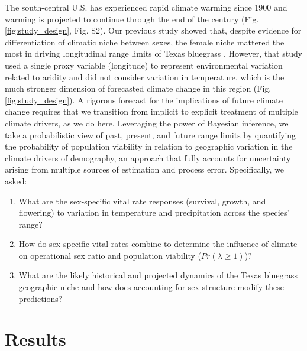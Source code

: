 \documentclass[9pt,twocolumn,twoside,lineno]{pnas-new}
\newcommand{\revise}[1]{{\color{Mahogany}{#1}}}
\begin{document}
The south-central U.S. has experienced rapid climate warming since 1900 and warming is projected to continue through the end of the century (Fig. \ref{fig:study_design}, Fig. S2). 
Our previous study showed that, despite evidence for differentiation of climatic niche between sexes, the female niche mattered the most in driving longitudinal range limits of Texas bluegrass \citep{miller2022two}. 
However, that study used a single proxy variable (longitude) to represent environmental variation related to aridity and did not consider variation in temperature, which is the much stronger dimension of forecasted climate change in this region (Fig. \ref{fig:study_design}). 
A rigorous forecast for the implications of future climate change requires that we transition from implicit to explicit treatment of multiple climate drivers, as we do here.
Leveraging the power of Bayesian inference, we take a probabilistic view of past, present, and future range limits by quantifying the probability of population viability \revise{($Pr(\lambda \ge 1)$)} in relation to geographic variation in the climate drivers of demography, an approach that fully accounts for uncertainty arising from multiple sources of estimation and process error. %
Specifically, we asked:
\begin{enumerate}
	\item What are the sex-specific vital rate responses (survival, growth, and flowering) to variation in temperature and precipitation across the species' range?
	\item How do sex-specific vital rates combine to determine the influence of climate on operational sex ratio and population viability ($Pr(\lambda \ge 1)$)?
	\item What are the likely historical and projected dynamics of the Texas bluegrass geographic niche and how does accounting for sex structure modify these predictions?
\end{enumerate}

\section*{Results}
\end{document}
